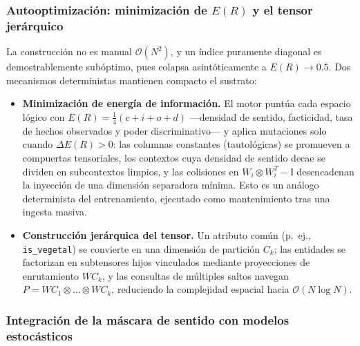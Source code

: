 \documentclass{article}
\providecommand{\tightlist}{%
  \setlength{\itemsep}{0pt}\setlength{\parskip}{0pt}}
\begin{document}
\hypertarget{autooptimizaciuxf3n-minimizaciuxf3n-de-er-y-el-tensor-jeruxe1rquico}{%
\subsubsection{\texorpdfstring{Autooptimización: minimización de
\(E(R)\) y el tensor jerárquico
\label{app:er}}{Autooptimización: minimización de E(R) y el tensor jerárquico }}\label{autooptimizaciuxf3n-minimizaciuxf3n-de-er-y-el-tensor-jeruxe1rquico}}

La construcción no es manual \(\mathcal{O}(N^2)\), y un índice puramente
diagonal es demostrablemente subóptimo, pues colapsa asintóticamente a
\(E(R) \to 0.5\). Dos mecanismos deterministas mantienen compacto el
sustrato:

\begin{itemize}
\tightlist
\item
  \textbf{Minimización de energía de información.} El motor puntúa cada
  espacio lógico con \(E(R) = \frac{1}{4}(c + i + o + d)\) ---densidad
  de sentido, facticidad, tasa de hechos observados y poder
  discriminativo--- y aplica mutaciones solo cuando \(\Delta E(R) > 0\):
  las columnas constantes (tautológicas) se promueven a compuertas
  tensoriales, los contextos cuya densidad de sentido decae se dividen
  en subcontextos limpios, y las colisiones en
  \(W_i \otimes W_i^{T} - \mathbb{I}\) desencadenan la inyección de una
  dimensión separadora mínima. Esto es un análogo determinista del
  entrenamiento, ejecutado como mantenimiento tras una ingesta masiva.
\item
  \textbf{Construcción jerárquica del tensor.} Un atributo común
  (p.~ej., \texttt{is\_vegetal}) se convierte en una dimensión de
  partición \(C_k\); las entidades se factorizan en subtensores hijos
  vinculados mediante proyecciones de enrutamiento \(WC_k\), y las
  consultas de múltiples saltos navegan
  \(P = WC_1 \otimes \dots \otimes WC_k\), reduciendo la complejidad
  espacial hacia \(\mathcal{O}(N \log N)\).
\end{itemize}

\hypertarget{integraciuxf3n-de-la-muxe1scara-de-sentido-con-modelos-estocuxe1sticos}{%
\subsubsection{\texorpdfstring{Integración de la máscara de sentido con
modelos estocásticos
\label{app:mask}}{Integración de la máscara de sentido con modelos estocásticos }}\label{integraciuxf3n-de-la-muxe1scara-de-sentido-con-modelos-estocuxe1sticos}}
\end{document}
